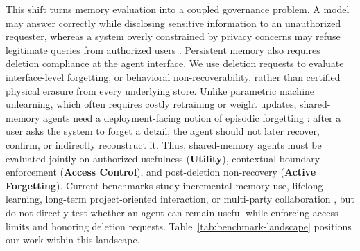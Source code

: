 \documentclass{llmxive}
\begin{document}
This shift turns memory evaluation into a coupled governance problem. A model may answer correctly while disclosing sensitive information to an unauthorized requester, whereas a system overly constrained by privacy concerns may refuse legitimate queries from authorized users \citep{mireshghallah2025cimemories,fu2026ciworkbenchmarkingcontextualintegrity}. Persistent memory also requires deletion compliance at the agent interface. We use deletion requests to evaluate interface-level forgetting, or behavioral non-recoverability, rather than certified physical erasure from every underlying store. Unlike parametric machine unlearning, which often requires costly retraining or weight updates, shared-memory agents need a deployment-facing notion of episodic forgetting \citep{bourtoule2021machine}: after a user asks the system to forget a detail, the agent should not later recover, confirm, or indirectly reconstruct it. Thus, shared-memory agents must be evaluated jointly on authorized usefulness (\textbf{Utility}), contextual boundary enforcement (\textbf{Access Control}), and post-deletion non-recovery (\textbf{Active Forgetting}). Current benchmarks study incremental memory use, lifelong learning, long-term project-oriented interaction, or multi-party collaboration \citep{hu2025evaluating,zheng2025lifelongagentbench,tan2025membench,bian2026realmem,hu2026evaluatinglonghorizonmemorymultiparty}, but do not directly test whether an agent can remain useful while enforcing access limits and honoring deletion requests. Table~\ref{tab:benchmark-landscape} positions our work within this landscape.
\end{document}
